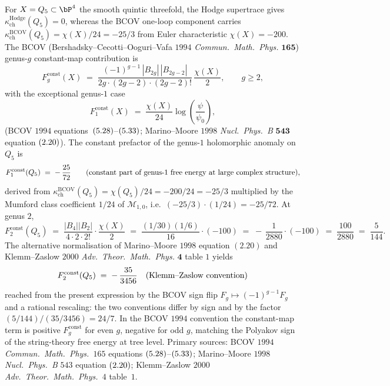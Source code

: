 \begin{proposition}
\label{prop:canonical-bcov-quintic}
For $X = Q_5\subset\bP^4$ the smooth quintic threefold, the Hodge
supertrace gives $\kappa_{\mathrm{ch}}^{\mathrm{Hodge}}(Q_5)=0$,
whereas the BCOV one-loop component carries
$\kappa_{\mathrm{ch}}^{\mathrm{BCOV}}(Q_5)=\chi(X)/24=-25/3$ from
Euler characteristic $\chi(X) = -200$. The BCOV
\textup{(}Bershadsky--Cecotti--Ooguri--Vafa $1994$ \emph{Commun.~Math.~Phys.}
$\mathbf{165}$\textup{)} genus-$g$ constant-map contribution is
\[
 F_g^{\mathrm{const}}(X)
 \;=\; \frac{(-1)^{g-1}\,|B_{2g}|\,|B_{2g-2}|}{2g\cdot(2g-2)\cdot(2g-2)!}\,\frac{\chi(X)}{2},
 \qquad g \geq 2,
\]
with the exceptional genus-$1$ case
\[
 F_1^{\mathrm{const}}(X)
 \;=\; \frac{\chi(X)}{24}\log\!\left(\frac{\psi}{\psi_0}\right),
\]
\textup{(}BCOV $1994$ equations~$\textup{(}5.28\textup{)}$--$\textup{(}5.33\textup{)}$;
Marino--Moore $1998$ \emph{Nucl.~Phys.~B} $\mathbf{543}$ equation
$\textup{(}2.20\textup{)}$\textup{)}. The constant prefactor of the genus-$1$ holomorphic
anomaly on $Q_5$ is
\[
 F_1^{\mathrm{const}}(Q_5) \;=\; -\,\frac{25}{72}
 \qquad\textup{(}\text{constant part of genus-1 free energy at large complex structure}\textup{)},
\]
derived from
$\kappa_{\mathrm{ch}}^{\mathrm{BCOV}}(Q_5)=\chi(Q_5)/24=-200/24=-25/3$
multiplied by the
Mumford class coefficient $1/24$ of $\mathcal M_{1,0}$, i.e.\
$(-25/3)\cdot(1/24) = -25/72$. At genus $2$,
\[
 F_2^{\mathrm{const}}(Q_5)
 \;=\; \frac{|B_4||B_2|}{4\cdot 2\cdot 2!}\cdot\frac{\chi(X)}{2}
 \;=\; \frac{(1/30)(1/6)}{16}\cdot (-100)
 \;=\; -\,\frac{1}{2880}\cdot(-100)
 \;=\; \frac{100}{2880} \;=\; \frac{5}{144}.
\]
The alternative normalisation of Marino--Moore $1998$
equation $(2.20)$ and Klemm--Zaslow $2000$ \emph{Adv.~Theor.~Math.~Phys.}
$\mathbf{4}$ table $1$ yields
\[
 F_2^{\mathrm{const}}(Q_5) \;=\; -\,\frac{35}{3456}\quad\textup{(}\text{Klemm--Zaslow convention}\textup{)}
\]
reached from the present expression by the BCOV sign flip
$F_g \mapsto (-1)^{g-1} F_g$ and a rational rescaling: the two
conventions differ by sign and by the factor
$(5/144)/(35/3456) = 24/7$. In the BCOV $1994$
convention the constant-map term is positive
$F_g^{\mathrm{const}}$ for even $g$, negative for odd $g$, matching
the Polyakov sign of the string-theory free energy at tree level.
Primary sources: BCOV $1994$ \emph{Commun.~Math.~Phys.~}$165$
equations $\textup{(}5.28\textup{)}$--$\textup{(}5.33\textup{)}$; Marino--Moore $1998$
\emph{Nucl.~Phys.~B} $543$ equation $\textup{(}2.20\textup{)}$; Klemm--Zaslow
$2000$ \emph{Adv.~Theor.~Math.~Phys.~}$4$ table~$1$.
\end{proposition}

